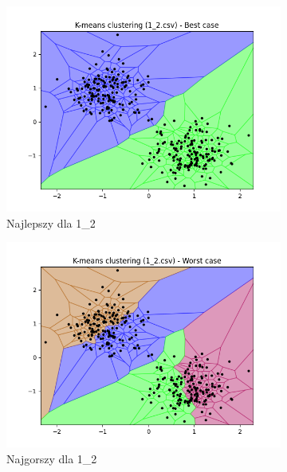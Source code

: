 \documentclass[12pt]{article}
\begin{document}
\begin{figure}[H]
\begin{subfigure}[b]{0.24\textwidth}
        \includegraphics[width=\linewidth]{img/exp_1/kmeans/1_2_best.png}
        \caption{Najlepszy dla 1\_2}
    \end{subfigure}
    \hfill
    \begin{subfigure}[b]{0.24\textwidth}
        \includegraphics[width=\linewidth]{img/exp_1/kmeans/1_2_worst.png}
        \caption{Najgorszy dla 1\_2}
    \end{subfigure}
    \begin{subfigure}[b]{0.24\textwidth}

\end{subfigure}
\end{figure}
\end{document}

